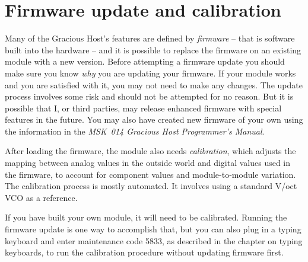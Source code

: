 
%
%
%
%
%
%

\chapter{Firmware update and calibration}

Many of the Gracious Host's features are defined by \emph{firmware} -- that
is software built into the hardware -- and it is possible to replace the
firmware on an existing module with a new version.  Before attempting a
firmware update you should make sure you know \emph{why} you are updating
your firmware.  If your module works and you are satisfied with it, you may
not need to make any changes.  The update process involves some risk and
should not be attempted for no reason.  But it is possible that I, or third
parties, may release enhanced firmware with special features in the future. 
You may also have created new firmware of your own using the information in
the \emph{MSK~014 Gracious Host Programmer's Manual}.

After loading the firmware, the module also needs \emph{calibration}, which
adjusts the mapping between analog values in the outside world and digital
values used in the firmware, to account for component values and
module-to-module variation.  The calibration process is mostly automated.  It
involves using a standard V/oct VCO as a reference.

If you have built your own module, it will need to be calibrated.  Running
the firmware update is one way to accomplish that, but you can also plug in
a typing keyboard and enter maintenance code 5833, as described in the
chapter on typing keyboards, to run the calibration procedure without
updating firmware first.

